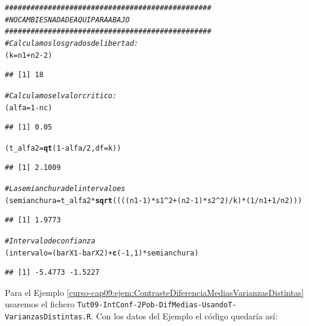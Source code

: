 \documentclass[10pt,a4paper]{article}\usepackage[]{graphicx}\usepackage[]{color}
\makeatletter
\newcommand{\hlnum}[1]{\textcolor[rgb]{0.686,0.059,0.569}{#1}}%
\newcommand{\hlcom}[1]{\textcolor[rgb]{0.678,0.584,0.686}{\textit{#1}}}%
\newcommand{\hlopt}[1]{\textcolor[rgb]{0,0,0}{#1}}%
\newcommand{\hlstd}[1]{\textcolor[rgb]{0.345,0.345,0.345}{#1}}%
\newcommand{\hlkwb}[1]{\textcolor[rgb]{0.69,0.353,0.396}{#1}}%
\newcommand{\hlkwc}[1]{\textcolor[rgb]{0.333,0.667,0.333}{#1}}%
\newcommand{\hlkwd}[1]{\textcolor[rgb]{0.737,0.353,0.396}{\textbf{#1}}}%
\newenvironment{kframe}{%
 \def\at@end@of@kframe{}%
 \ifinner\ifhmode%
  \def\at@end@of@kframe{\end{minipage}}%
  \begin{minipage}{\columnwidth}%
 \fi\fi%
 \def\FrameCommand##1{\hskip\@totalleftmargin \hskip-\fboxsep
 \colorbox{shadecolor}{##1}\hskip-\fboxsep
     \hskip-\linewidth \hskip-\@totalleftmargin \hskip\columnwidth}%
 \MakeFramed {\advance\hsize-\width
   \@totalleftmargin\z@ \linewidth\hsize
   \@setminipage}}%
 {\par\unskip\endMakeFramed%
 \at@end@of@kframe}
\newenvironment{knitrout}{}{} %
\makeatother
\begin{document}
\begin{knitrout}
\begin{kframe}
\begin{alltt}
\hlcom{################################################}
\hlcom{#NO CAMBIES NADA DE AQUI PARA ABAJO}
\hlcom{################################################}
\hlcom{# Calculamos los grados de libertad:}
\hlstd{(k} \hlkwb{=} \hlstd{n1} \hlopt{+} \hlstd{n2} \hlopt{-} \hlnum{2}\hlstd{)}
\end{alltt}
\begin{verbatim}
## [1] 18
\end{verbatim}
\begin{alltt}
\hlcom{# Calculamos el valor critico:}
\hlstd{(alfa} \hlkwb{=} \hlnum{1} \hlopt{-} \hlstd{nc)}
\end{alltt}
\begin{verbatim}
## [1] 0.05
\end{verbatim}
\begin{alltt}
\hlstd{(t_alfa2} \hlkwb{=} \hlkwd{qt}\hlstd{(}\hlnum{1} \hlopt{-} \hlstd{alfa}\hlopt{/}\hlnum{2}\hlstd{,} \hlkwc{df}\hlstd{=k))}
\end{alltt}
\begin{verbatim}
## [1] 2.1009
\end{verbatim}
\begin{alltt}
\hlcom{# La semianchura del intervalo es}
\hlstd{(semianchura} \hlkwb{=} \hlstd{t_alfa2} \hlopt{*} \hlkwd{sqrt}\hlstd{((((n1} \hlopt{-} \hlnum{1}\hlstd{)} \hlopt{*} \hlstd{s1}\hlopt{^}\hlnum{2} \hlopt{+} \hlstd{(n2} \hlopt{-} \hlnum{1}\hlstd{)} \hlopt{*} \hlstd{s2}\hlopt{^}\hlnum{2}\hlstd{)} \hlopt{/}\hlstd{k)} \hlopt{*} \hlstd{(}\hlnum{1}\hlopt{/}\hlstd{n1} \hlopt{+} \hlnum{1}\hlopt{/}\hlstd{n2)))}
\end{alltt}
\begin{verbatim}
## [1] 1.9773
\end{verbatim}
\begin{alltt}
\hlcom{# Intervalo de confianza}
\hlstd{(intervalo} \hlkwb{=} \hlstd{(barX1} \hlopt{-} \hlstd{barX2)} \hlopt{+} \hlkwd{c}\hlstd{(}\hlopt{-}\hlnum{1}\hlstd{,} \hlnum{1}\hlstd{)} \hlopt{*} \hlstd{semianchura)}
\end{alltt}
\begin{verbatim}
## [1] -5.4773 -1.5227
\end{verbatim}
\end{kframe}
\end{knitrout}

Para el Ejemplo \ref{curso-cap09:ejem:ContrasteDiferenciaMediasVarianzasDistintas} usaremos el fichero {\tt Tut09-IntConf-2Pob-DifMedias-UsandoT-VarianzasDistintas.R}. Con los datos del Ejemplo el código quedaría así:
\end{document}
